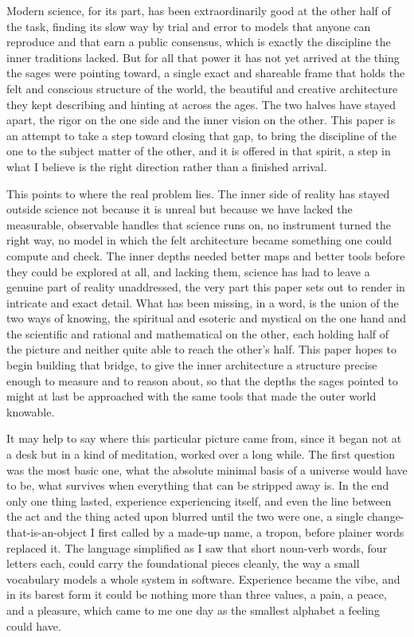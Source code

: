 Modern science, for its part, has been extraordinarily good at the other half of the task, finding its slow way by trial and error to models that anyone can reproduce and that earn a public consensus, which is exactly the discipline the inner traditions lacked. But for all that power it has not yet arrived at the thing the sages were pointing toward, a single exact and shareable frame that holds the felt and conscious structure of the world, the beautiful and creative architecture they kept describing and hinting at across the ages. The two halves have stayed apart, the rigor on the one side and the inner vision on the other. This paper is an attempt to take a step toward closing that gap, to bring the discipline of the one to the subject matter of the other, and it is offered in that spirit, a step in what I believe is the right direction rather than a finished arrival.

This points to where the real problem lies. The inner side of reality has stayed outside science not because it is unreal but because we have lacked the measurable, observable handles that science runs on, no instrument turned the right way, no model in which the felt architecture became something one could compute and check. The inner depths needed better maps and better tools before they could be explored at all, and lacking them, science has had to leave a genuine part of reality unaddressed, the very part this paper sets out to render in intricate and exact detail. What has been missing, in a word, is the union of the two ways of knowing, the spiritual and esoteric and mystical on the one hand and the scientific and rational and mathematical on the other, each holding half of the picture and neither quite able to reach the other's half. This paper hopes to begin building that bridge, to give the inner architecture a structure precise enough to measure and to reason about, so that the depths the sages pointed to might at last be approached with the same tools that made the outer world knowable.

It may help to say where this particular picture came from, since it began not at a desk but in a kind of meditation, worked over a long while. The first question was the most basic one, what the absolute minimal basis of a universe would have to be, what survives when everything that can be stripped away is. In the end only one thing lasted, experience experiencing itself, and even the line between the act and the thing acted upon blurred until the two were one, a single change-that-is-an-object I first called by a made-up name, a tropon, before plainer words replaced it. The language simplified as I saw that short noun-verb words, four letters each, could carry the foundational pieces cleanly, the way a small vocabulary models a whole system in software. Experience became the vibe, and in its barest form it could be nothing more than three values, a pain, a peace, and a pleasure, which came to me one day as the smallest alphabet a feeling could have.

